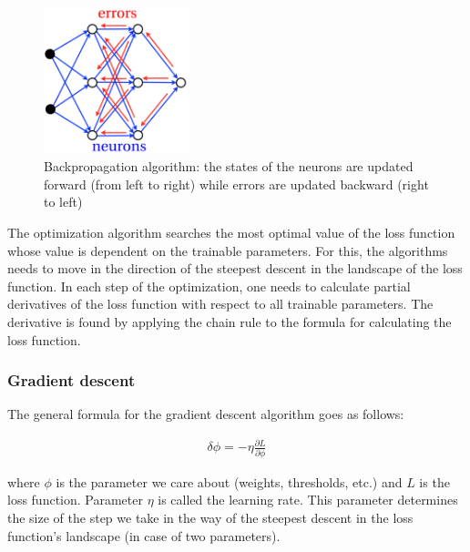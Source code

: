 \vspace{3mm}
\begin{figure}[htb]
	\begin{center}
		\includegraphics*[width=4.2cm, keepaspectratio]{obr/backpropagation.png}
	\end{center}
	\vspace{3mm}
	\caption{Backpropagation algorithm: the states of the neurons are updated forward
		(from left to right) while errors are updated backward (right to left) \cite{mehlig}} 
	\label{backprop}	
\end{figure}


The optimization algorithm searches the most optimal value of the loss function whose value is dependent on the trainable parameters. For this, the algorithms needs to move in the direction of the steepest descent in the landscape of the loss function. In each step of the optimization, one needs to calculate partial derivatives of the loss function with respect to all trainable parameters. The derivative is found by applying the chain rule to the formula for calculating the loss function. \cite{mehlig}

\subsubsection{Gradient descent}

The general formula for the gradient descent algorithm goes as follows:

\begin{gather}
	\delta \phi = - \eta \frac{\partial L}{\partial \phi}
\end{gather}

\noindent where $ \phi $ is the parameter we care about (weights, thresholds, etc.) and $ L $ is the loss function. Parameter $ \eta $ is called the learning rate. This parameter determines the size of the step we take in the way of the steepest descent in the loss function's landscape (in case of two parameters). 


